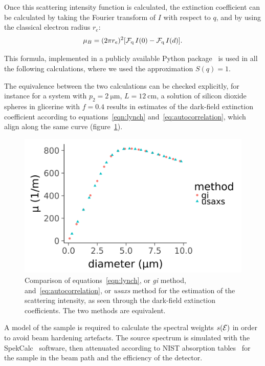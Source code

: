 Once this scattering intensity function is calculated, the extinction
coefficient can be calculated by taking the Fourier transform of $I$ with respect
to $q$, and by using the classical electron radius $r_e$:
\begin{equation}
\mu_B = (2 \pi r_e)^2 [\operatorname{\mathcal{F}_{q}} I(0) - \operatorname{\mathcal{F}_{q}} I(d)].
    \label{eq:autocorrelation}
\end{equation}

This formula, implemented in a publicly available Python
package~\parencite{scattering-repository}
is used in all the following calculations, where we used the approximation
$S(q) = 1$.

The equivalence between the two calculations can be checked explicitly, for
instance for a system with $p_2 = \SI{2}{\micro\meter}$, $L =
\SI{12}{\centi\meter}$, a solution of silicon dioxide spheres in glicerine
with $f = 0.4$ results in estimates of the dark-field extinction coefficient
according to equations~\eqref{eqn:lynch} and~\eqref{eq:autocorrelation},
which align along the same curve (figure~\ref{fig:equivalence-lynch-saxs}).

\begin{figure}[ht]
    \centering
    \includegraphics[width=\columnwidth]{gfx/lynch-vs-saxs/plot.png}
    \caption{Comparison of equations~\eqref{eqn:lynch}, or \emph{gi} method,
    and~\eqref{eq:autocorrelation}, or \emph{usaxs} method for the
estimation of the scattering intensity, as seen through the dark-field
extinction coefficients. The two methods are equivalent.}
    \label{fig:equivalence-lynch-saxs}
\end{figure}

A model of the sample is required to calculate the spectral weights
$s(\mathcal{E})$ in order to avoid beam hardening artefacts. The source spectrum is
simulated with the SpekCalc~\parencite{spekcalc} software, then attenuated
according to NIST absorption tables~\parencite{Hubbell_1995} for the sample in the beam path and the
efficiency of the detector.

